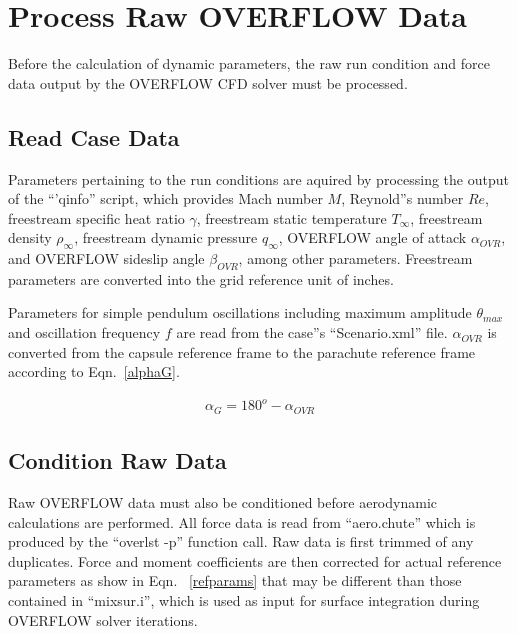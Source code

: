 \documentclass[]{aiaa-tc}%
\begin{document}
\section{Process Raw OVERFLOW Data} %

Before the calculation of dynamic parameters, the raw run condition and force data output by the OVERFLOW CFD solver must be processed.


\subsection{Read Case Data}

Parameters pertaining to the run conditions are aquired by processing the output of the ``'qinfo'' script, which provides Mach number $M$, Reynold''s number $Re$, freestream specific heat ratio $\gamma$, freestream static temperature $T_{\infty}$, freestream density $\rho_{\infty}$, freestream dynamic pressure $q_{\infty}$, OVERFLOW angle of attack $\alpha_{OVR}$, and OVERFLOW sideslip angle $\beta_{OVR}$, among other parameters.  Freestream parameters are converted into the grid reference unit of inches.

Parameters for simple pendulum oscillations including maximum amplitude $\theta_{max}$ and oscillation frequency $f$ are read from the case''s ``Scenario.xml'' file.  $\alpha_{OVR}$ is converted from the capsule reference frame to the parachute reference frame according to Eqn.~\ref{alphaG}.

\begin{equation}
\begin{split}
\alpha_G = 180^o - \alpha_{OVR}
\end{split}
\label{alphaG}
\end{equation}


\subsection{Condition Raw Data}

Raw OVERFLOW data must also be conditioned before aerodynamic calculations are performed.  All force data is read from ``aero.chute'' which is produced by the ``overlst -p'' function call.  Raw data is first trimmed of any duplicates.  Force and moment coefficients are then corrected for actual reference parameters as show in Eqn. ~\ref{refparams} that may be different than those contained in ``mixsur.i'', which is used as input for surface integration during OVERFLOW solver iterations.
\end{document}
